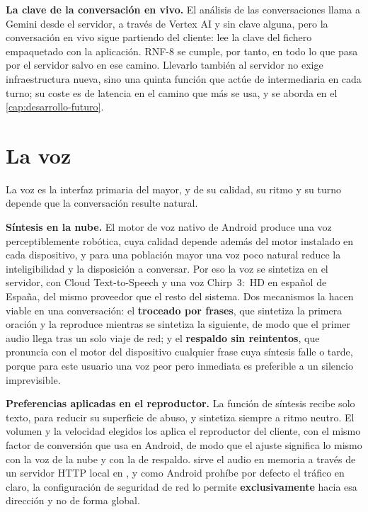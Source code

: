 \textbf{La clave de la conversación en vivo.} El análisis de las conversaciones llama a Gemini desde el
servidor, a través de Vertex AI y sin clave alguna, pero la conversación en vivo sigue partiendo del
cliente:  lee la clave del fichero  empaquetado con la aplicación. RNF-8 se
cumple, por tanto, en todo lo que pasa por el servidor salvo en ese camino. Llevarlo también al servidor no
exige infraestructura nueva, sino una quinta función que actúe de intermediaria en cada turno; su coste es
de latencia en el camino que más se usa, y se aborda en el \autoref{cap:desarrollo-futuro}.

\section{La voz}
\label{sec:voz}

La voz es la interfaz primaria del mayor, y de su calidad, su ritmo y su turno depende que la conversación
resulte natural.

\textbf{Síntesis en la nube.} El motor de voz nativo de Android produce una voz perceptiblemente robótica,
cuya calidad depende además del motor instalado en cada dispositivo, y para una población mayor una voz poco
natural reduce la inteligibilidad y la disposición a conversar. Por eso la voz se sintetiza en el servidor,
con Cloud Text-to-Speech y una voz Chirp~3:~HD en español de España, del mismo proveedor que el resto del
sistema. Dos mecanismos la hacen viable en una conversación: el \textbf{troceado por frases}, que sintetiza
la primera oración y la reproduce mientras se sintetiza la siguiente, de modo que el primer audio llega tras
un solo viaje de red; y el \textbf{respaldo sin reintentos}, que pronuncia con el motor del dispositivo
cualquier frase cuya síntesis falle o tarde, porque para este usuario una voz peor pero inmediata es
preferible a un silencio imprevisible.

\textbf{Preferencias aplicadas en el reproductor.} La función de síntesis recibe solo texto, para reducir su
superficie de abuso, y sintetiza siempre a ritmo neutro. El volumen y la velocidad elegidos los aplica el
reproductor del cliente, con el mismo factor de conversión que  usa en Android, de modo
que el ajuste significa lo mismo con la voz de la nube y con la de respaldo.  sirve el
audio en memoria a través de un servidor HTTP local en , y como Android prohíbe por defecto
el tráfico en claro, la configuración de seguridad de red lo permite \textbf{exclusivamente} hacia esa
dirección y no de forma global.

